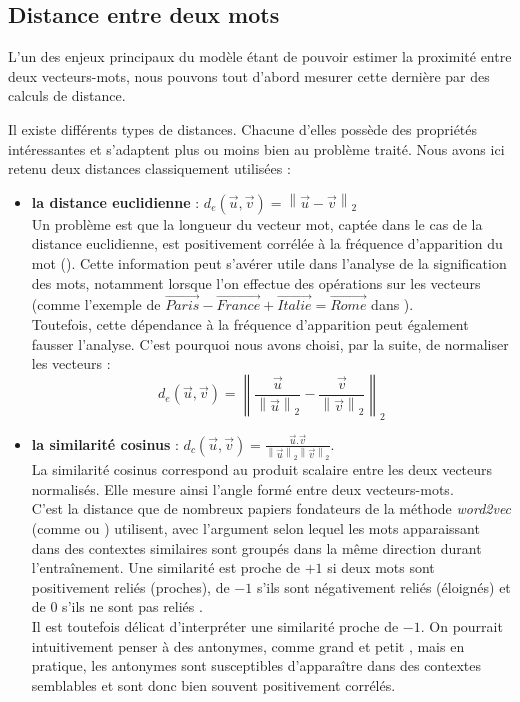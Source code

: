 \documentclass[11pt,french,french]{article}
\providecommand{\tightlist}{%
  \setlength{\parskip}{0pt}
  }
\begin{document}
\hypertarget{distance-entre-deux-mots}{%
\subsection{Distance entre deux mots}\label{distance-entre-deux-mots}}

L'un des enjeux principaux du modèle étant de pouvoir estimer la proximité entre deux vecteurs-mots, nous pouvons tout d'abord mesurer cette dernière par des calculs de distance.

Il existe différents types de distances. Chacune d'elles possède des propriétés intéressantes et s'adaptent plus ou moins bien au problème traité. Nous avons ici retenu deux distances classiquement utilisées :

\begin{itemize}
\tightlist
\item
  \textbf{la distance euclidienne} : \(d_{e}(\vec{u},\vec{v}) = \left\| \vec{u} - \vec{v} \right\|_2\)\\
  Un problème est que la longueur du vecteur mot, captée dans le cas de la distance euclidienne, est positivement corrélée à la fréquence d'apparition du mot (\cite{Schakel}). Cette information peut s'avérer utile dans l'analyse de la signification des mots, notamment lorsque l'on effectue des opérations sur les vecteurs (comme l'exemple de \(\overrightarrow{Paris} - \overrightarrow{France} + \overrightarrow{Italie} = \overrightarrow{Rome}\) dans \cite{Mikolov}).\\
  Toutefois, cette dépendance à la fréquence d'apparition peut également fausser l'analyse. C'est pourquoi nous avons choisi, par la suite, de normaliser les vecteurs :
  \[ d_{e}(\vec{u},\vec{v}) = \left\| \frac{\vec{u}}{\left\| \vec{u} \right\|_2} - \frac{\vec{v}}{\left\| \vec{v} \right\|_2}  \right\|_2\]
\item
  \textbf{la similarité cosinus} : \(d_{c}(\vec{u}, \vec{v}) = \frac{\vec{u}.\vec{v}}{\left\| \vec{u} \right\|_2 \left\| \vec{v} \right\|_2 }\).\\
  La similarité cosinus correspond au produit scalaire entre les deux vecteurs normalisés. Elle mesure ainsi l'angle formé entre deux vecteurs-mots.\\
  C'est la distance que de nombreux papiers fondateurs de la méthode \emph{word2vec} (comme \cite{Mikolov} ou \cite{Levy}) utilisent, avec l'argument selon lequel les mots apparaissant dans des contextes similaires sont groupés dans la même direction durant l'entraînement.
  Une similarité est proche de \(+1\) si deux mots sont positivement reliés (proches), de \(-1\) s'ils sont négativement reliés (éloignés) et de 0 s'ils ne sont pas \og reliés \fg{}.\\
  Il est toutefois délicat d'interpréter une similarité proche de \(-1\). On pourrait intuitivement penser à des antonymes, comme \og grand \fg{} et \og petit \fg{}, mais en pratique, les antonymes sont susceptibles d'apparaître dans des contextes semblables et sont donc bien souvent positivement corrélés.
\end{itemize}
\end{document}
